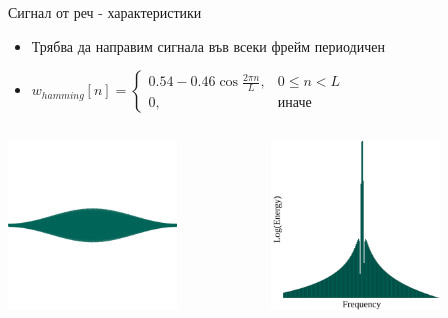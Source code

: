 \documentclass[9pt]{beamer}
\begin{document}
    \begin{frame}[t]{Сигнал от реч - характеристики}
        \pause
        \begin{itemize}
            \item Трябва да направим сигнала във всеки фрейм периодичен
            \pause
            \item $w_{hamming}[n] = \begin{cases} 
                0.54 - 0.46 \cos{\frac{2\pi n}{L}}, & 0\leq n < L \\
                0, & \text{иначе}
            \end{cases}$
        \end{itemize}
        \pause
        \begin{columns}[t]
            \begin{column}{0.48\textwidth}
                \includegraphics[width=0.7\textwidth]{ham.png} 
            \end{column}
            \hfill
            \begin{column}{0.48\textwidth}
                \includegraphics[width=0.7\textwidth]{ham_coef.png} 

\end{column}
\end{columns}
\end{frame}
\end{document}
